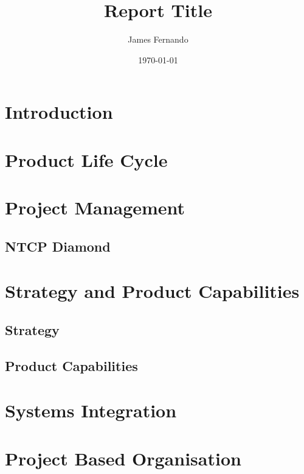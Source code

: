 \documentclass[a4paper,12pt]{scrartcl}
\title{Report Title}
\author{James Fernando}
\date{\today}
\begin{document}
	
	\begin{titlepage}
		\maketitle
	\end{titlepage}
	
	\tableofcontents
	\newpage
	\section{Introduction}
	{
		
	}
	\section{Product Life Cycle}
	{
	
	}
	\section{Project Management}
	{
		\subsection{NTCP Diamond}

	}
	\section{Strategy and Product Capabilities}
	{
		\subsection{Strategy}{}
		
		\subsection{Product Capabilities}{}
	}
	\section{Systems Integration}
	{
	
	}
	\section{Project Based Organisation}
	{
	
	}
	\section{}
	{
	
	}
	\section{}
	{
	
	}
	\section{}
	{
	
	}
	
	
	\newpage
	
	\printbibliography[heading=bibintoc,title=References]
\end{document}

